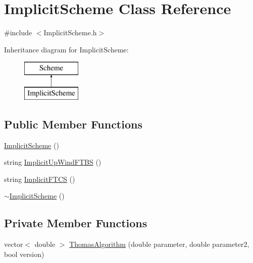 \hypertarget{class_implicit_scheme}{}\section{Implicit\+Scheme Class Reference}
\label{class_implicit_scheme}


{\ttfamily \#include $<$Implicit\+Scheme.\+h$>$}

Inheritance diagram for Implicit\+Scheme\+:\begin{figure}[H]
\begin{center}
\leavevmode
\includegraphics[height=2.000000cm]{class_implicit_scheme}
\end{center}
\end{figure}
\subsection*{Public Member Functions}
\begin{DoxyCompactItemize}
\item 
\mbox{\hyperlink{class_implicit_scheme_a7bb3a64ab8d7ca0b58ed4ba9817b8c12}{Implicit\+Scheme}} ()
\item 
string \mbox{\hyperlink{class_implicit_scheme_ab8311a005d69690622e0ddaa0dcff94d}{Implicit\+Up\+Wind\+F\+T\+BS}} ()
\item 
string \mbox{\hyperlink{class_implicit_scheme_afd2b8e73e914a04c326b8cba0d5810ce}{Implicit\+F\+T\+CS}} ()
\item 
\mbox{\hyperlink{class_implicit_scheme_aca61347d2335e248678f7f3060785762}{$\sim$\+Implicit\+Scheme}} ()
\end{DoxyCompactItemize}
\subsection*{Private Member Functions}
\begin{DoxyCompactItemize}
\item 
vector$<$ double $>$ \mbox{\hyperlink{class_implicit_scheme_a2f0cee270b60bc42f8f5e864255f5e29}{Thomas\+Algorithm}} (double parameter, double parameter2, bool version)
\end{DoxyCompactItemize}

